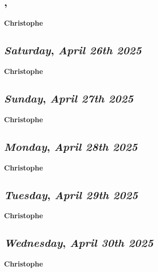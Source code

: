 \subsection*{\weekday, \day}
\textbf {Christophe}

\def\day{\textit{April 26th 2025}}
\def\weekday{\textit{Saturday}}
\subsection*{\weekday, \day}
\textbf {Christophe}

\def\day{\textit{April 27th 2025}}
\def\weekday{\textit{Sunday}}
\subsection*{\weekday, \day}
\textbf {Christophe}

\def\day{\textit{April 28th 2025}}
\def\weekday{\textit{Monday}}
\subsection*{\weekday, \day}
\textbf {Christophe}

\def\day{\textit{April 29th 2025}}
\def\weekday{\textit{Tuesday}}
\subsection*{\weekday, \day}
\textbf {Christophe}

\def\day{\textit{April 30th 2025}}
\def\weekday{\textit{Wednesday}}
\subsection*{\weekday, \day}
\textbf {Christophe}
